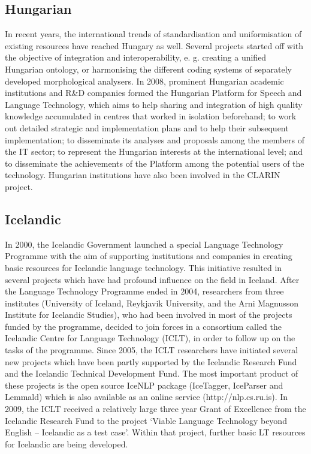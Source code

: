 \documentclass[10pt, plain]{../../metanetpaper}
\begin{document}
\begin{multicols}{2}
\begin{small}
\subsection*{Hungarian}
\label{sec:hungarian}

In recent years, the international trends of standardisation and uniformisation of existing resources have reached Hungary as well. Several projects started off with the objective of integration and interoperability, e. g. creating a unified Hungarian ontology, or harmonising the different coding systems of separately developed morphological analysers. In 2008, prominent Hungarian academic institutions and R\&D companies formed the Hungarian Platform for Speech and Language Technology, which aims to help sharing and integration of high quality knowledge accumulated in centres that worked in isolation beforehand; to work out detailed strategic and implementation plans and to help their subsequent implementation; to disseminate its analyses and proposals among the members of the IT sector; to represent the Hungarian interests at the international level; and to disseminate the achievements of the Platform among the potential users of the technology. Hungarian institutions have also been involved in the CLARIN project.

\subsection*{Icelandic}
\label{sec:icelandic}

In 2000, the Icelandic Government launched a special Language Technology Programme with the aim of supporting institutions and companies in creating basic resources for Icelandic language technology. This initiative resulted in several projects which have had profound influence on the field in Iceland. After the Language Technology Programme ended in 2004, researchers from three institutes (University of Iceland, Reykjavik University, and the Arni Magnusson Institute for Icelandic Studies), who had been involved in most of the projects funded by the programme, decided to join forces in a consortium called the Icelandic Centre for Language Technology (ICLT), in order to follow up on the tasks of the programme. Since 2005, the ICLT researchers have initiated several new projects which have been partly supported by the Icelandic Research Fund and the Icelandic Technical Development Fund. The most important product of these projects is the open source IceNLP package (IceTagger, IceParser and Lemmald) which is also available as an online service (http://nlp.cs.ru.is). In 2009, the ICLT received a relatively large three year Grant of Excellence from the Icelandic Research Fund to the project ‘Viable Language Technology beyond English – Icelandic as a test case’. Within that project, further basic LT resources for Icelandic are being developed.


\end{small}
\end{multicols}
\end{document}
